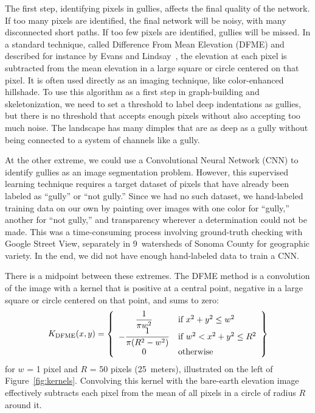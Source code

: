 The first step, identifying pixels in gullies, affects the final quality of the network. If too many pixels are identified, the final network will be noisy, with many disconnected short paths. If too few pixels are identified, gullies will be missed. In a standard technique, called Difference From Mean Elevation (DFME) and described for instance by Evans and Lindsay~\citep{evans2010}, the elevation at each pixel is subtracted from the mean elevation in a large square or circle centered on that pixel. It is often used directly as an imaging technique, like color-enhanced hillshade. To use this algorithm as a first step in graph-building and skeletonization, we need to set a threshold to label deep indentations as gullies, but there is no threshold that accepts enough pixels without also accepting too much noise. The landscape has many dimples that are as deep as a gully without being connected to a system of channels like a gully.

At the other extreme, we could use a Convolutional Neural Network (CNN) to identify gullies as an image segmentation problem. However, this supervised learning technique requires a target dataset of pixels that have already been labeled as ``gully'' or ``not gully.'' Since we had no such dataset, we hand-labeled training data on our own by painting over images with one color for ``gully,'' another for ``not gully,'' and transparency wherever a determination could not be made. This was a time-consuming process involving ground-truth checking with Google Street View, separately in 9~watersheds of Sonoma County for geographic variety. In the end, we did not have enough hand-labeled data to train a CNN.

There is a midpoint between these extremes. The DFME method is a convolution of the image with a kernel that is positive at a central point, negative in a large square or circle centered on that point, and sums to zero:
\[
K_{\mathrm{DFME}}(x,y)=
\left\{\begin{array}{c l}
\dfrac{1}{\pi w^2} & \textrm{if } x^2+y^2\le w^2 \\
-\dfrac{1}{\pi(R^2-w^2)} & \textrm{if } w^2<x^2+y^2\le R^2 \\
0 & \textrm{otherwise}
\end{array}\right\}
\]
for $w$ = 1 pixel and $R$ = 50 pixels (25~meters), illustrated on the left of Figure~\ref{fig:kernels}. Convolving this kernel with the bare-earth elevation image effectively subtracts each pixel from the mean of all pixels in a circle of radius $R$ around it.

